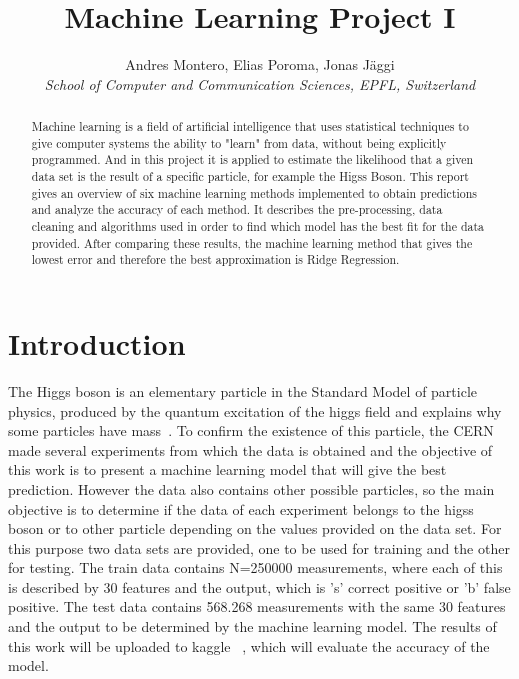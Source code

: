 \documentclass[10pt,conference,compsocconf]{IEEEtran}
\begin{document}
\title{Machine Learning Project I}

\author{
  Andres Montero, Elias Poroma, Jonas J\"aggi\\
  \textit{School of Computer and Communication Sciences, EPFL, Switzerland}
}

\maketitle

\begin{abstract}
  Machine learning is a field of artificial intelligence that uses statistical 
  techniques to give computer systems the ability to "learn" from data, 
  without being explicitly programmed. And in this project it is applied 
  to estimate the likelihood that a given data set is the result of a
  specific particle, for example the Higss Boson.
  This report gives an overview of six machine learning methods implemented
  to obtain predictions and analyze the accuracy of each method. It describes 
  the pre-processing, data cleaning and algorithms used in order to find which
  model has the best fit for the data provided. After comparing these results,
  the machine learning method that gives the lowest error and therefore the
  best approximation is Ridge Regression.

\end{abstract}

\section{Introduction}

The Higgs boson is an elementary particle in the Standard Model of 
particle physics, produced by the quantum excitation of the higgs field
and explains why some particles have mass~\cite{wiki01}. To confirm 
the existence of this particle, the CERN made several experiments from 
which the data is obtained and the objective of this work is to present 
a machine learning model that will give the best prediction. However 
the data also contains other possible particles, so the main 
objective is to determine if the data of each experiment belongs to 
the higss boson or to other particle depending on the values provided
on the data set. For this purpose two data sets are provided, one to 
be used for training and the other for testing. 
The train data contains N=250000 measurements, where each of this
is described by 30 features and the output, which is 's' correct positive
or 'b' false positive. The test data contains 568.268 measurements with
the same 30 features and the output to be determined by the machine
learning model. The results of this work will be uploaded to kaggle ~\cite{kaggle01}, 
which will evaluate the accuracy of the model.
\end{document}
